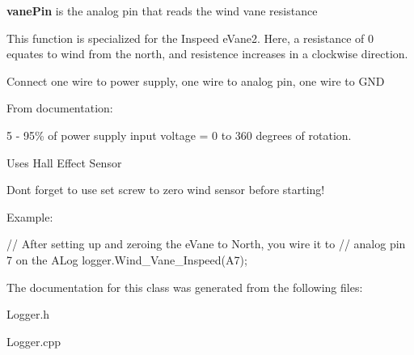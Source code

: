 {\bfseries vane\+Pin} is the analog pin that reads the wind vane resistance

This function is specialized for the Inspeed e\+Vane2. Here, a resistance of 0 equates to wind from the north, and resistence increases in a clockwise direction.

Connect one wire to power supply, one wire to analog pin, one wire to G\+ND

From documentation\+:
\begin{DoxyItemize}
\item 5 -\/ 95\% of power supply input voltage = 0 to 360 degrees of rotation.
\item Uses Hall Effect Sensor
\item Don\textquotesingle{}t forget to use set screw to zero wind sensor before starting!
\end{DoxyItemize}

Example\+: 
\begin{DoxyCode}
\textcolor{comment}{// After setting up and zeroing the eVane to North, you wire it to }
\textcolor{comment}{// analog pin 7 on the ALog}
logger.Wind\_Vane\_Inspeed(A7);
\end{DoxyCode}


The documentation for this class was generated from the following files\+:\begin{DoxyCompactItemize}
\item 
Logger.\+h\item 
Logger.\+cpp\end{DoxyCompactItemize}
